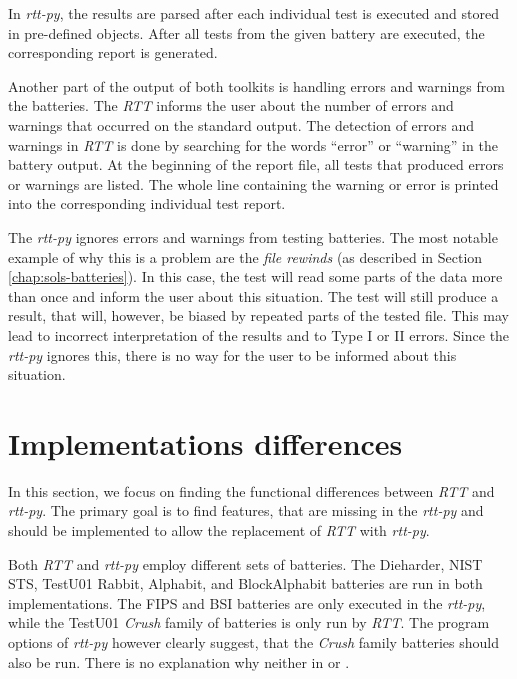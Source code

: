 \documentclass[
  digital,     %
  oneside,     %
  nosansbold,  %
  nocolorbold, %
  nolof,         %
  nolot,         %
]{fithesis4}
\begin{document}
In \emph{rtt-py}, the results are parsed after each individual test is executed and stored in pre-defined objects. After all tests from the given battery are executed, the corresponding report is generated.

Another part of the output of both toolkits is handling errors and warnings from the batteries. The \emph{RTT} informs the user about the number of errors and warnings that occurred on the standard output. The detection of errors and warnings in \emph{RTT} is done by searching for the words ``error'' or ``warning'' in the battery output. At the beginning of the report file, all tests that produced errors or warnings are listed. The whole line containing the warning or error is printed into the corresponding individual test report.

The \emph{rtt-py} ignores errors and warnings from testing batteries. The most notable example of why this is a problem are the \emph{file rewinds} (as described in Section \ref{chap:sols-batteries}). In this case, the test will read some parts of the data more than once and inform the user about this situation. The test will still produce a result, that will, however, be biased by repeated parts of the tested file. This may lead to incorrect interpretation of the results and to Type I or II errors. Since the \emph{rtt-py} ignores this, there is no way for the user to be informed about this situation.
 


\section{Implementations differences}
In this section, we focus on finding the functional differences between \emph{RTT} and \emph{rtt-py}. The primary goal is to find features, that are missing in the \emph{rtt-py} and should be implemented to allow the replacement of \emph{RTT} with \emph{rtt-py}. 

Both \emph{RTT} and \emph{rtt-py} employ different sets of batteries. The Dieharder, NIST STS, TestU01 Rabbit, Alphabit, and BlockAlphabit batteries are run in both implementations. The FIPS and BSI batteries are only executed in the \emph{rtt-py}, while the TestU01 \emph{Crush} family of batteries is only run by \emph{RTT}. The program options of \emph{rtt-py} however clearly suggest, that the \emph{Crush} family batteries should also be run. There is no explanation why neither in \cite{vavercak} or \cite{rtt-py-site}.
\end{document}
